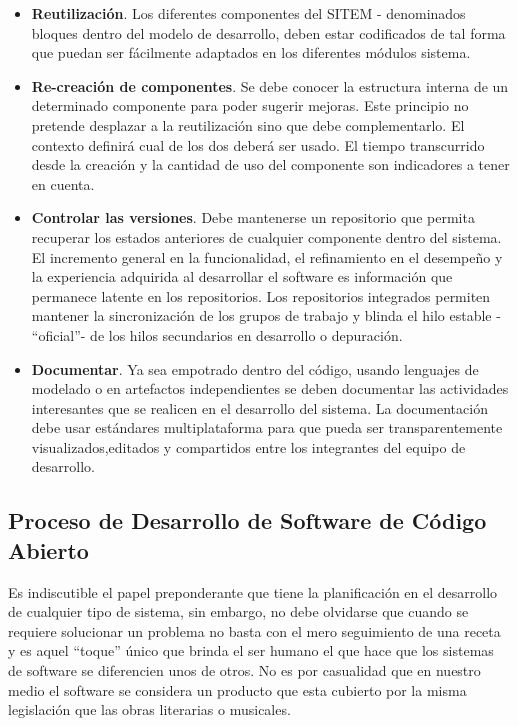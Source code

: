 \begin{itemize}
\item \textbf{Reutilización}. Los diferentes componentes del SITEM - denominados bloques dentro del modelo de desarrollo, deben estar codificados de tal forma que puedan ser fácilmente adaptados en los diferentes módulos sistema.

\item \textbf{Re-creación de componentes}. Se debe conocer la estructura interna de un determinado componente para poder sugerir mejoras. Este principio no pretende desplazar a la reutilización sino que debe complementarlo. El contexto definirá cual de los dos deberá ser usado. El tiempo transcurrido desde la creación y la cantidad de uso del componente son indicadores a tener en cuenta.

\item \textbf{Controlar las versiones}. Debe mantenerse un repositorio que permita recuperar los estados anteriores de cualquier componente dentro del sistema. El incremento general en la funcionalidad, el refinamiento en el desempeño y la experiencia adquirida al desarrollar el software es información que permanece latente en los repositorios. Los repositorios integrados permiten mantener la sincronización de los grupos de trabajo y blinda el hilo estable - “oficial”- de los hilos secundarios en desarrollo o depuración. 

\item \textbf{Documentar}. Ya sea empotrado dentro del código, usando lenguajes de modelado o en artefactos independientes se deben documentar las actividades interesantes que se realicen en el desarrollo del sistema. La documentación debe usar estándares multiplataforma para que pueda ser transparentemente visualizados,editados y compartidos entre los integrantes del equipo de desarrollo.
\end{itemize}

\subsection{Proceso de Desarrollo de Software de Código Abierto}
Es indiscutible el papel preponderante que tiene la planificación en el desarrollo de cualquier tipo de sistema, sin embargo, no debe olvidarse que cuando se requiere solucionar un problema no basta con el mero seguimiento de una receta y es aquel “toque” único que brinda el ser humano el que hace que los sistemas de software se diferencien unos de otros. No es por casualidad que en nuestro medio el software se considera un producto que esta cubierto por la misma legislación que las obras literarias o musicales.

